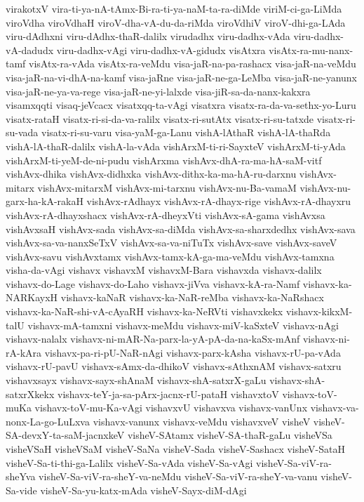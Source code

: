 {virakotxV
vira-ti-ya-nA-tAmx-Bi-ra-ti-ya-naM-ta-ra-diMde
viriM-ci-ga-LiMda
viroVdha
viroVdhaH
viroV-dha-vA-du-da-riMda
viroVdhiV
viroV-dhi-ga-LAda
viru-dAdhxni
viru-dAdhx-thaR-dalilx
virudadhx
viru-dadhx-vAda
viru-dadhx-vA-dadudx
viru-dadhx-vAgi
viru-dadhx-vA-gidudx
visAtxra
visAtx-ra-mu-nanx-tamf
visAtx-ra-vAda
visAtx-ra-veMdu
visa-jaR-na-pa-rashacx
visa-jaR-na-veMdu
visa-jaR-na-vi-dhA-na-kamf
visa-jaRne
visa-jaR-ne-ga-LeMba
visa-jaR-ne-yanunx
visa-jaR-ne-ya-va-rege
visa-jaR-ne-yi-lalxde
visa-jiR-sa-da-nanx-kakxra
visamxqqti
visaq-jeVcacx
visatxqq-ta-vAgi
visatxra
visatx-ra-da-va-sethx-yo-Luru
visatx-rataH
visatx-ri-si-da-va-ralilx
visatx-ri-sutAtx
visatx-ri-su-tatxde
visatx-ri-su-vada
visatx-ri-su-varu
visa-yaM-ga-Lanu
vishA-lAthaR
vishA-lA-thaRda
vishA-lA-thaR-dalilx
vishA-la-vAda
vishArxM-ti-ri-SayxteV
vishArxM-ti-yAda
vishArxM-ti-yeM-de-ni-pudu
vishArxma
vishAvx-dhA-ra-ma-hA-saM-vitf
vishAvx-dhika
vishAvx-didhxka
vishAvx-dithx-ka-ma-hA-ru-darxnu
vishAvx-mitarx
vishAvx-mitarxM
vishAvx-mi-tarxnu
vishAvx-nu-Ba-vamaM
vishAvx-nu-garx-ha-kA-rakaH
vishAvx-rAdhayx
vishAvx-rA-dhayx-rige
vishAvx-rA-dhayxru
vishAvx-rA-dhayxshacx
vishAvx-rA-dheyxVti
vishAvx-sA-gama
vishAvxsa
vishAvxsaH
vishAvx-sada
vishAvx-sa-diMda
vishAvx-sa-sharxdedhx
vishAvx-sava
vishAvx-sa-va-nanxSeTxV
vishAvx-sa-va-niTuTx
vishAvx-save
vishAvx-saveV
vishAvx-savu
vishAvxtamx
vishAvx-tamx-kA-ga-ma-veMdu
vishAvx-tamxna
visha-da-vAgi
vishavx
vishavxM
vishavxM-Bara
vishavxda
vishavx-dalilx
vishavx-do-Lage
vishavx-do-Laho
vishavx-jiVva
vishavx-kA-ra-Namf
vishavx-ka-NARKayxH
vishavx-kaNaR
vishavx-ka-NaR-reMba
vishavx-ka-NaRshacx
vishavx-ka-NaR-shi-vA-cAyaRH
vishavx-ka-NeRVti
vishavxkekx
vishavx-kikxM-talU
vishavx-mA-tamxni
vishavx-meMdu
vishavx-miV-kaSxteV
vishavx-nAgi
vishavx-nalalx
vishavx-ni-mAR-Na-parx-la-yA-pA-da-na-kaSx-mAnf
vishavx-ni-rA-kAra
vishavx-pa-ri-pU-NaR-nAgi
vishavx-parx-kAsha
vishavx-rU-pa-vAda
vishavx-rU-pavU
vishavx-sAmx-da-dhikoV
vishavx-sAthxnAM
vishavx-satxru
vishavxsayx
vishavx-sayx-shAnaM
vishavx-shA-satxrX-gaLu
vishavx-shA-satxrXkekx
vishavx-teY-ja-sa-pArx-jacnx-rU-pataH
vishavxtoV
vishavx-toV-muKa
vishavx-toV-mu-Ka-vAgi
vishavxvU
vishavxva
vishavx-vanUnx
vishavx-va-nonx-La-go-LuLxva
vishavx-vanunx
vishavx-veMdu
vishavxveV
visheV
visheV-SA-devxY-ta-saM-jacnxkeV
visheV-SAtamx
visheV-SA-thaR-gaLu
visheVSa
visheVSaH
visheVSaM
visheV-SaNa
visheV-Sada
visheV-Sashacx
visheV-SataH
visheV-Sa-ti-thi-ga-Lalilx
visheV-Sa-vAda
visheV-Sa-vAgi
visheV-Sa-viV-ra-sheYva
visheV-Sa-viV-ra-sheY-va-neMdu
visheV-Sa-viV-ra-sheY-va-vanu
visheV-Sa-vide
visheV-Sa-yu-katx-mAda
visheV-Sayx-diM-dAgi
}
